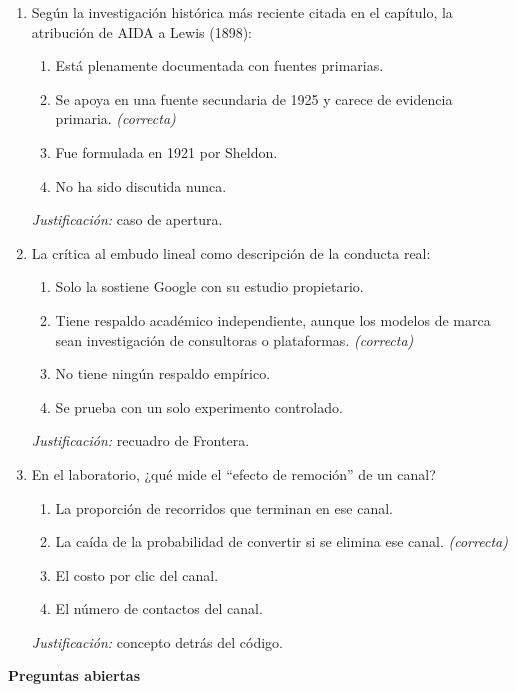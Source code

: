 \begin{enumerate}
  \item Según la investigación histórica más reciente citada en el capítulo,
  la atribución de AIDA a Lewis (1898):
  \begin{enumerate}
    \item[a)] Está plenamente documentada con fuentes primarias.
    \item[b)] Se apoya en una fuente secundaria de 1925 y carece de evidencia primaria. \textit{(correcta)}
    \item[c)] Fue formulada en 1921 por Sheldon.
    \item[d)] No ha sido discutida nunca.
  \end{enumerate}
  \textit{Justificación:} caso de apertura.

  \item La crítica al embudo lineal como descripción de la conducta real:
  \begin{enumerate}
    \item[a)] Solo la sostiene Google con su estudio propietario.
    \item[b)] Tiene respaldo académico independiente, aunque los modelos de marca sean investigación de consultoras o plataformas. \textit{(correcta)}
    \item[c)] No tiene ningún respaldo empírico.
    \item[d)] Se prueba con un solo experimento controlado.
  \end{enumerate}
  \textit{Justificación:} recuadro de Frontera.

  \item En el laboratorio, ¿qué mide el \enquote{efecto de remoción} de un
  canal?
  \begin{enumerate}
    \item[a)] La proporción de recorridos que terminan en ese canal.
    \item[b)] La caída de la probabilidad de convertir si se elimina ese canal. \textit{(correcta)}
    \item[c)] El costo por clic del canal.
    \item[d)] El número de contactos del canal.
  \end{enumerate}
  \textit{Justificación:} concepto detrás del código.
\end{enumerate}

\textbf{Preguntas abiertas}

